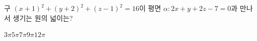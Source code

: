 구 $(x+1)^2+(y+2)^2+(z-1)^2=16$이 평면 $\alpha\colon 2x+y+2z-7=0$과 만나서 생기는 원의 넓이는?
\begin{choices32}{$3\pi$}{$5\pi$}{$7\pi$}{$9\pi$}{$12\pi$}\end{choices32}
